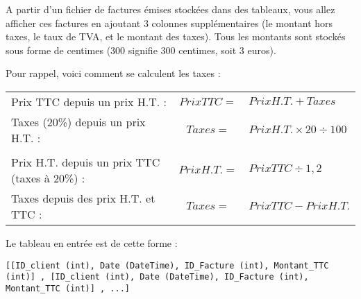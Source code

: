 

\vspace*{0.7cm}

\noindent {}

\bigskip

\noindent A partir d'un fichier de factures émises stockées dans des tableaux, vous allez afficher ces factures en ajoutant 3 colonnes supplémentaires (le montant hors taxes, le taux de TVA, et le montant des taxes).
Tous les montants sont stockés sous forme de centimes (300 signifie 300 centimes, soit 3 euros).

\bigskip

\noindent Pour rappel, voici comment se calculent les taxes :\\

\begin{tabular}{l c l}
Prix TTC depuis un prix H.T. : & $ Prix TTC = $ & $ Prix H.T. + Taxes $ \\
Taxes (20\%) depuis un prix H.T. : & $ Taxes = $ & $ Prix H.T. \times 20 \div 100 $ \\
 & & \\
Prix H.T. depuis un prix TTC (taxes à 20\%) : & $ Prix H.T. = $ & $ Prix TTC \div 1,2 $ \\
Taxes depuis des prix H.T. et TTC : & $ Taxes = $ & $ Prix TTC - Prix H.T. $ \\
\end{tabular}

\bigskip

\bigskip

\noindent Le tableau en entrée est de cette forme : \\

\hspace*{-\parindent} %
\begin{minipage}{17cm} %
\lstset{language=sh}
\begin{lstlisting}[frame=single,title={Tableau en entrée}]
[[ID_client (int), Date (DateTime), ID_Facture (int), Montant_TTC (int)] , [ID_client (int), Date (DateTime), ID_Facture (int), Montant_TTC (int)] , ...]
\end{lstlisting}
\end{minipage} %

